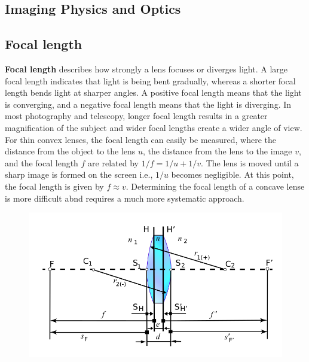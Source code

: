 \documentclass[10pt]{article}
\begin{document}
\begin{multicols}{2}
\justifying


\section{Imaging Physics and Optics}

\subsection{Focal length}

\textbf{Focal length} describes how strongly a lens focuses or diverges light. A large focal length indicates that light is being bent gradually, whereas a shorter focal length bends light at sharper angles.
A positive focal length means that the light is converging, and a negative focal length means that the light is diverging. In most photography and telescopy, longer focal length results in a greater magnification of the subject and wider focal lengths create a wider angle of view.
\newline \newline
For thin convex lenses, the focal length can easily be measured, where the distance from the object to the lens $u$, the distance from the lens to the image $v$, and the focal length $f$ are related by \(1/f = 1/u + 1/v\).
The lens is moved until a sharp image is formed on the screen i.e., $1/u$ becomes negligible. At this point, the focal length is given by $f\approx v$.
Determining the focal length of a concave lense is more difficult abnd requires a much more systematic approach.
\newline \newline
\begin{figure}[H]
    \centering
    \includegraphics[width=1\linewidth]{Images/Week 1/Thick_Lens_Diagram.svg.png}

\end{figure}
\end{multicols}
\end{document}
